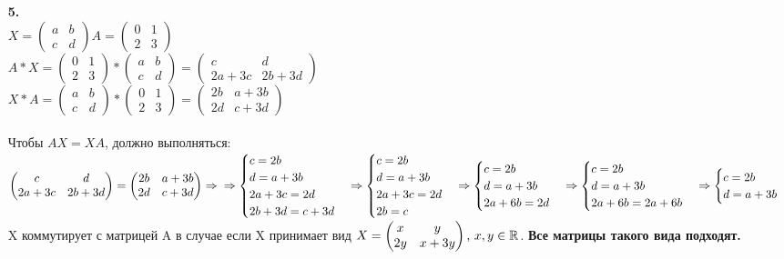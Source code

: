 \documentclass[a4paper]{article}
\newcommand{\mat}[1]{\begin{pmatrix} #1 \end{pmatrix}}
\newcommand{\RR}{\mathbb{R}}
\begin{document}
\begin{enumerate}
    \item[\textbf{5.}] \indent\\
    $X = \mat{a & b \\ c & d}$\space $A = \mat{0 & 1 \\ 2 & 3}$\\
    $A*X = \mat{0 & 1 \\ 2 & 3}*\mat{a & b \\ c & d} = \mat{c & d \\ 2a+3c & 2b+3d}$\\
    $X*A = \mat{a & b \\ c & d}*\mat{0 & 1 \\ 2 & 3} = \mat{2b & a+3b \\ 2d & c+3d}$\\\\
    Чтобы $AX=XA$, должно выполняться: \\
    $\mat{c & d \\ 2a+3c & 2b+3d} = \mat{2b & a+3b \\ 2d & c+3d} \Rightarrow\\ \Rightarrow
    \begin{cases}
        c=2b\\
        d=a+3b\\
        2a+3c=2d\\
        2b+3d=c+3d
    \end{cases}\Rightarrow \begin{cases}c=2b\\d=a+3b\\2a+3c=2d\\2b=c \end{cases}
    \Rightarrow \begin{cases}c=2b\\d=a+3b\\2a+6b=2d \end{cases}
    \Rightarrow \begin{cases}c=2b\\d=a+3b\\2a+6b=2a+6b \end{cases}
    \Rightarrow \begin{cases}c=2b\\d=a+3b \end{cases}$\\
    X коммутирует с матрицей A в случае если X принимает вид $X = \mat{x & y \\ 2y & x+3y} \text{,\space} x,y \in \RR$. \textbf{Все матрицы такого вида подходят.}


\end{enumerate}
\end{document}
